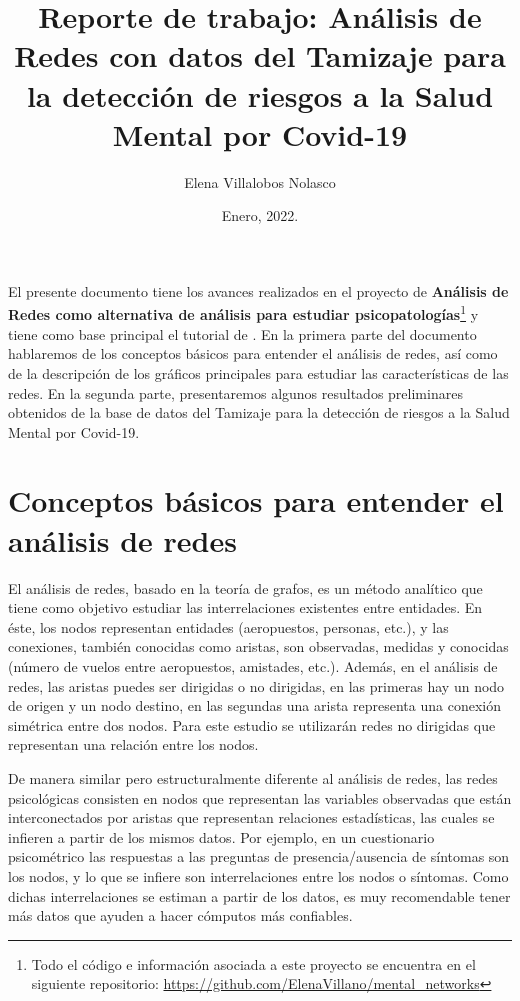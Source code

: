 \documentclass[11pt,spanish]{article}\usepackage[]{graphicx}\usepackage[]{color}
\title{\huge{Reporte de trabajo: Análisis de Redes con datos del Tamizaje para la detección de riesgos a la Salud Mental por Covid-19}}
\author[ ]{Elena Villalobos Nolasco}
\date{Enero, 2022.}
\begin{document}
\maketitle


El presente documento tiene los avances realizados en el proyecto de {\bf Análisis de Redes como alternativa de análisis para estudiar psicopatologías}\footnote{Todo el código e información asociada a este proyecto se encuentra en el siguiente repositorio: \url{https://github.com/ElenaVillano/mental_networks}} y tiene como base principal el tutorial de \cite{main_tutorial}. En la primera parte del documento hablaremos de los conceptos básicos para entender el análisis de redes, así como de la descripción de los gráficos principales para estudiar las características de las redes. En la segunda parte, presentaremos algunos resultados preliminares obtenidos de la base de datos del Tamizaje para la detección de riesgos a la Salud Mental por Covid-19. 


\section{Conceptos básicos para entender el análisis de redes}

El análisis de redes, basado en la teoría de grafos, es un método analítico que tiene como objetivo estudiar las interrelaciones existentes entre entidades. En éste, los nodos representan entidades (aeropuestos, personas, etc.), y las conexiones, también conocidas como aristas, son observadas, medidas y conocidas (número de vuelos entre aeropuestos, amistades, etc.). Además, en el análisis de redes, las aristas puedes ser dirigidas o no dirigidas, en las primeras hay un nodo de origen y un nodo destino, en las segundas una arista representa una conexión simétrica entre dos nodos. Para este estudio se utilizarán redes no dirigidas que representan una relación entre los nodos. 

De manera similar pero estructuralmente diferente al análisis de redes, las redes psicológicas consisten en nodos que representan las variables observadas que están interconectados por aristas que representan relaciones estadísticas, las cuales se infieren a partir de los mismos datos. Por ejemplo, en un cuestionario psicométrico las respuestas a las preguntas de presencia/ausencia de síntomas son los nodos, y lo que se infiere son interrelaciones entre los nodos o síntomas. Como dichas interrelaciones se estiman a partir de los datos, es muy recomendable tener más datos que ayuden a hacer cómputos más confiables.
\end{document}
